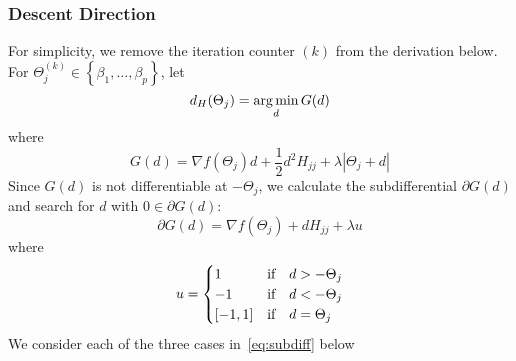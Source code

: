 \subsubsection{Descent Direction}
For simplicity, we remove the iteration counter $(k)$ from the derivation below.\\ For \mbox{$\Theta_j^{(k)} \in \left\lbrace \beta_1, \ldots, \beta_p \right\rbrace$}, let
\begin{equation}
d_{H}(\Theta_{j}) = \operatorname*{arg\,min}_{d} G(d)  \label{eq:argminGd}
\end{equation}
where
\[ G(d) =  \nabla f(\Theta_{j}) d + \frac{1}{2} d^2 H_{j j} + \lambda |\Theta_{j} + d| \]
Since $G(d)$ is not differentiable at $-\Theta_j$, we calculate the subdifferential $\partial G(d)$ and search for $d$ with $0 \in \partial G(d)$:
\begin{equation}
\partial G(d) = \nabla f(\Theta_{j}) + d H_{j j} + \lambda u   \label{eq:subdiff}
\end{equation}
where
\begin{equation}
u = \begin{cases}
1 & \textrm{{if\quad}}d > -\Theta_j \\
-1 & \textrm{{if\quad}} d < -\Theta_j\\
[-1,1] & \textrm{{if\quad}} d = \Theta_j
\end{cases}
\end{equation}
We consider each of the three cases in~\eqref{eq:subdiff} below
